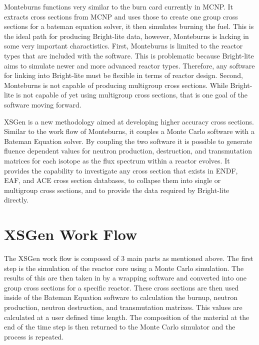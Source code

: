 \documentclass{article}
\begin{document}
Monteburns functions very similar to the burn card currently in MCNP. It extracts cross sections from MCNP and uses those to create one group cross sections for a bateman equation solver, it then simulates burning the fuel. This is the ideal path for producing Bright-lite data, however, Monteburns is lacking in some very important charactistics. First, Monteburns is limited to the reactor types that are included with the software. This is problematic because Bright-lite aims to simulate newer and more advanced reactor types. Therefore, any software for linking into Bright-lite must be flexible in terms of reactor design. Second, Monteburns is not capable of producing multigroup cross sections. While Bright-lite is not capable of yet using multigroup cross sections, that is one goal of the software moving forward.   

XSGen is a new methodology aimed at developing higher accuracy cross sections. Similar to the work flow of Monteburns, it couples a Monte Carlo software with a Bateman Equation solver.  By coupling the two software it is possible to generate fluence dependent values for neutron production, destruction, and transmutation matrices for each isotope as the flux spectrum within a reactor evolves. It provides the capability to investigate any cross section that exists in ENDF, EAF, and ACE cross section databases, to collapse them into single or multigroup cross sections, and to provide the data required by Bright-lite directly. 

\section{XSGen Work Flow}
The XSGen work flow is composed of 3 main parts as mentioned above. The first step is the simulation of the reactor core using a Monte Carlo simulation. The results of this are then taken in by a wrapping software and converted into one group cross sections for a specific reactor. These cross sections are then used inside of the Bateman Equation software to calculation the burnup, neutron production, neutron destruction, and transmutation matrixes. This values are calculated at a user defined time length. The composition of the material at the end of the time step is then returned to the Monte Carlo simulator and the process is repeated.
\end{document}
